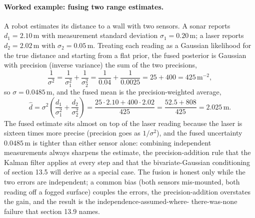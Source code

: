 \paragraph{Worked example: fusing two range estimates.} A robot
estimates its distance to a wall with two sensors. A sonar reports
$d_{1} = 2.10\,\text{m}$ with measurement standard deviation $\sigma_{1}
= 0.20\,\text{m}$; a laser reports $d_{2} = 2.02\,\text{m}$ with
$\sigma_{2} = 0.05\,\text{m}$. Treating each reading as a Gaussian
likelihood for the true distance and starting from a flat prior, the
fused posterior is Gaussian with precision (inverse variance) the sum of
the two precisions,
\[
\frac{1}{\sigma^{2}} = \frac{1}{\sigma_{1}^{2}} +
\frac{1}{\sigma_{2}^{2}} = \frac{1}{0.04} + \frac{1}{0.0025}
= 25 + 400 = 425\,\text{m}^{-2},
\]
so $\sigma = 0.0485\,\text{m}$, and the fused mean is the
precision-weighted average,
\[
\hat d = \sigma^{2}\!\left(\frac{d_{1}}{\sigma_{1}^{2}} +
\frac{d_{2}}{\sigma_{2}^{2}}\right)
= \frac{25 \cdot 2.10 + 400 \cdot 2.02}{425}
= \frac{52.5 + 808}{425} = 2.025\,\text{m}.
\]
The fused estimate sits almost on top of the laser reading because the
laser is sixteen times more precise (precision goes as $1/\sigma^{2}$),
and the fused uncertainty $0.0485\,\text{m}$ is tighter than either
sensor alone: combining independent measurements always sharpens the
estimate, the precision-addition rule that the Kalman filter applies at
every step and that the bivariate-Gaussian conditioning of section 13.5
will derive as a special case. The fusion is honest only while the two
errors are independent; a common bias (both sensors mis-mounted, both
reading off a fogged surface) couples the errors, the precision-addition
overstates the gain, and the result is the independence-assumed-where-
there-was-none failure that section 13.9 names.

